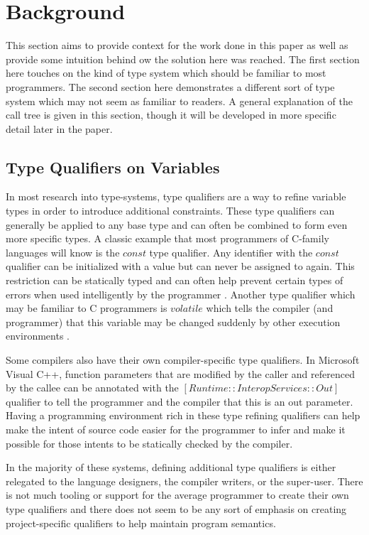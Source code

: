 \chapter{Background}

This section aims to provide context for the work done in this paper as well as provide some intuition behind ow the solution here was reached.  The first section here touches on the kind of type system which should be familiar to most programmers.  The second section here demonstrates a different sort of type system which may not seem as familiar to readers.  A general explanation of the call tree is given in this section, though it will be developed in more specific detail later in the paper.  

\section{Type Qualifiers on Variables}

In most research into type-systems, type qualifiers are a way to refine variable types in order to introduce additional constraints.  These type qualifiers can generally be applied to any base type and can often be combined to form even more specific types.  A classic example that most programmers of C-family languages will know is the $const$ type qualifier.  Any identifier with the $const$ qualifier can be initialized with a value but can never be assigned to again.  This restriction can be statically typed and can often help prevent certain types of errors when used intelligently by the programmer \cite{theory-of-qual}.  Another type qualifier which may be familiar to C programmers is $volatile$ which tells the compiler (and programmer) that this variable may be changed suddenly by other execution environments \cite{theory-of-qual}.

Some compilers also have their own compiler-specific type qualifiers.  In Microsoft Visual C++, function parameters that are modified by the caller and referenced by the callee can be annotated with the $[Runtime::InteropServices::Out]$ qualifier to tell the programmer and the compiler that this is an out parameter.  Having a programming environment rich in these type refining qualifiers can help make the intent of source code easier for the programmer to infer and make it possible for those intents to be statically checked by the compiler.  

In the majority of these systems, defining additional type qualifiers is either relegated to the language designers, the compiler writers, or the super-user.  There is not much tooling or support for the average programmer to create their own type qualifiers and there does not seem to be any sort of emphasis on creating project-specific qualifiers to help maintain program semantics.

